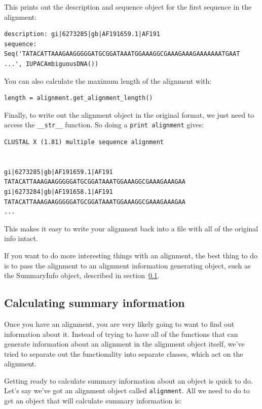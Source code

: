 \documentclass{report}
\begin{document}
This prints out the description and sequence object for the first sequence in the alignment:

\begin{verbatim}
description: gi|6273285|gb|AF191659.1|AF191
sequence: Seq('TATACATTAAAGAAGGGGGATGCGGATAAATGGAAAGGCGAAAGAAAGAAAAAAATGAAT 
...', IUPACAmbiguousDNA())
\end{verbatim}

You can also calculate the maximum length of the alignment with:

\begin{verbatim}
length = alignment.get_alignment_length()
\end{verbatim}

Finally, to write out the alignment object in the original format, we just need to access the \verb|__str__| function. So doing a \verb|print alignment| gives:

\begin{verbatim}
CLUSTAL X (1.81) multiple sequence alignment


gi|6273285|gb|AF191659.1|AF191      TATACATTAAAGAAGGGGGATGCGGATAAATGGAAAGGCGAAAGAAAGAA
gi|6273284|gb|AF191658.1|AF191      TATACATTAAAGAAGGGGGATGCGGATAAATGGAAAGGCGAAAGAAAGAA
...
\end{verbatim}

This makes it easy to write your alignment back into a file with all of the original info intact.


If you want to do more interesting things with an alignment, the best thing to do is to pass the alignment to an alignment information generating object, such as the SummaryInfo object, described in section~\ref{sec:summary_info}.

\subsection{Calculating summary information}
\label{sec:summary_info}

Once you have an alignment, you are very likely going to want to find out information about it. Instead of trying to have all of the functions that can generate information about an alignment in the alignment object itself, we've tried to separate out the functionality into separate classes, which act on the alignment. 


Getting ready to calculate summary information about an object is quick to do. Let's say we've got an alignment object called \verb|alignment|. All we need to do to get an object that will calculate summary information is:
\end{document}
